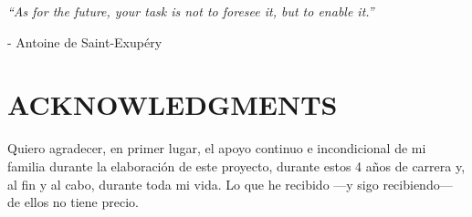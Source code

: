 \documentclass[a4paper, 11pt, english, twoside]{article}
\begin{document}
 


\newpage
\thispagestyle{empty}
\begin{landscape}
    
\end{landscape}



\newpage
\thispagestyle{empty}

\begin{flushright} %
\vspace*{5cm} %

\textit{“As for the future, your task is not to foresee it, but to enable it.”} 

\medskip %
- Antoine de Saint-Exupéry

\end{flushright}

\afterpage{\blankpage} %


\newpage
\thispagestyle{plain} %

\section*{ACKNOWLEDGMENTS} %
{} %

Quiero agradecer, en primer lugar, el apoyo continuo e incondicional de mi familia durante la elaboración de este proyecto, durante estos 4 años de carrera y, al fin y al cabo, durante toda mi vida. Lo que he recibido ---y sigo recibiendo--- de ellos no tiene precio.
\end{document}
